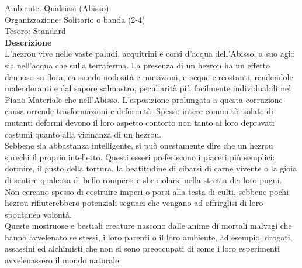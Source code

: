 \begin{multicols}{2}
Ambiente: Qualsiasi (Abisso)\\
Organizzazione: Solitario o banda (2-4)\\
Tesoro: Standard\\
\textbf{Descrizione}\\
L’hezrou vive nelle vaste paludi, acquitrini e corsi d’acqua dell’Abisso, a suo agio sia nell’acqua che sulla terraferma. La presenza di un hezrou ha un effetto dannoso su flora, causando nodosità e mutazioni, e acque circostanti, rendendole maleodoranti e dal sapore salmastro, peculiarità più facilmente individuabili nel Piano Materiale che nell’Abisso. L’esposizione prolungata a questa corruzione causa orrende trasformazioni e deformità. Spesso intere comunità isolate di mutanti deformi devono il loro aspetto contorto non tanto ai loro depravati costumi quanto alla vicinanza di un hezrou.\\
Sebbene sia abbastanza intelligente, si può onestamente dire che un hezrou sprechi il proprio intelletto. Questi esseri preferiscono i piaceri più semplici: dormire, il gusto della tortura, la beatitudine di cibarsi di carne vivente o la gioia di sentire qualcosa di bello rompersi e sbriciolarsi nella stretta dei loro pugni. Non cercano spesso di costruire imperi o porsi alla testa di culti, sebbene pochi hezrou rifiuterebbero potenziali seguaci che vengano ad offrirglisi di loro spontanea volontà.\\
Queste mostruose e bestiali creature nascono dalle anime di mortali malvagi che hanno avvelenato se stessi, i loro parenti o il loro ambiente, ad esempio, drogati, assassini ed alchimisti che non si sono preoccupati di come i loro esperimenti avvelenassero il mondo naturale.\\


\end{multicols}
